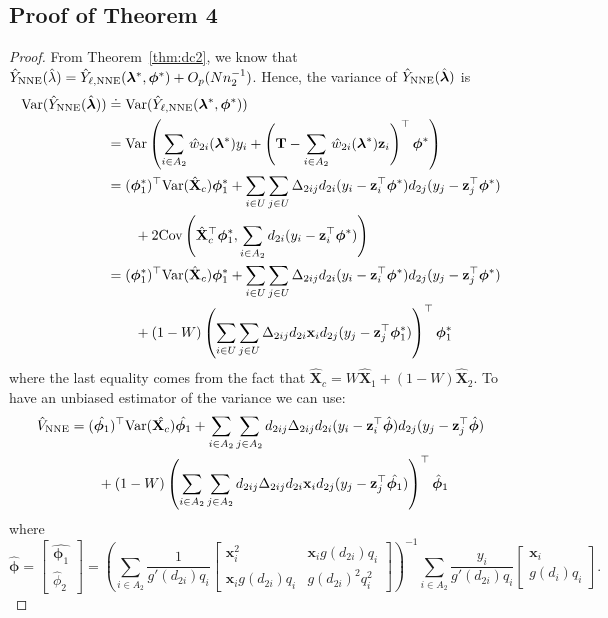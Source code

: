 \documentclass[12pt]{article}
\newcommand{\Cov}{{\text{Cov}}}
\newcommand{\Var}{{\text{Var}}}
\renewcommand{\bf}[1]{\mathbf{#1}}
\begin{document}
\subsection{Proof of Theorem 4}

\begin{proof}
  From Theorem~\ref{thm:dc2}, we know that $\hat Y_{\rm NNE}(\hat \lambda) = 
  \hat Y_{\ell, \rm NNE}(\bm \lambda^*, \bm \phi^*) + O_p(Nn_2^{-1})$. Hence, the
  variance of $\hat Y_{\rm NNE}(\hat{\bm \lambda})$ is 
  \begin{align*}
    \Var(\hat Y_{\rm NNE}(\hat{\bm \lambda})) 
    &\doteq \Var(\hat Y_{\ell, \rm NNE}(\bm \lambda^*, \bm \phi^*)) \\ 
    &= \Var\left(\sum_{i \in A_2} \hat w_{2i}(\bm \lambda^*) y_i + 
      \left(\bf T - \sum_{i \in A_2} \hat w_{2i}(\bm \lambda^*) \bf z_i
    \right)^\top \bm \phi^*\right)\\
    &= (\bm \phi_1^*)^\top \Var(\hat{\bf X}_c) \bm \phi_1^* + 
    \sum_{i \in U} \sum_{j \in U} \Delta_{2ij}d_{2i} 
    (y_i - \bf{z}_i^\top \bm \phi^*)d_{2j}(y_j - \bf{z}_j^\top \bm \phi^*)\\
    &\qquad+ 2 \Cov\left(\hat{\bf X}_c^\top \bm \phi_1^*, \sum_{i \in A_2} 
    d_{2i}(y_i - \bf{z}_i^\top \bm \phi^*)\right) \\
    &= (\bm \phi_1^*)^\top \Var(\hat{\bf X}_c) \bm \phi_1^* + 
    \sum_{i \in U} \sum_{j \in U} \Delta_{2ij}d_{2i}
    (y_i - \bf{z}_i^\top \bm \phi^*)d_{2j}(y_j - \bf{z}_j^\top \bm \phi^*)\\
    &\qquad + (1 - W)\left(\sum_{i \in U} \sum_{j \in U} \Delta_{2ij} 
    d_{2i}\bf{x}_i d_{2j}(y_j - \bf{z}_j^\top \bm \phi^*_1)\right)^\top \bm \phi_1^* \\
  \end{align*}
where the last equality comes from the fact that $\hat{\bf X}_c = W\hat{\bf
X}_1 + (1 - W) \hat{\bf X}_2$. To have an unbiased estimator of the variance
  we can use:
  \begin{align*}
    \hat V_{\rm NNE} 
    &= (\hat{\bm \phi_1})^\top \Var(\hat{\bf X_c}) \hat{\bm \phi_1} + 
    \sum_{i \in A_2} \sum_{j \in A_2} d_{2ij}\Delta_{2ij}d_{2i}
    (y_i - \bf{z}^\top_i \hat{\bm \phi})d_{2j}(y_j - \bf{z}^\top_j \hat{\bm \phi}) \\
    &\qquad + (1 - W)\left(\sum_{i \in A_2} \sum_{j \in A_2} 
      d_{2ij} \Delta_{2ij} d_{2i}\bf{x}_i
    d_{2j}(y_j - \bf{z}^\top_j \hat{\bm \phi_1})\right)^\top \hat{\bm \phi}_1 
  \end{align*}
  where 
  $$\hat{\bm \phi} =
  \begin{bmatrix}
    \hat{\bm \phi_1} \\ \hat \phi_2
  \end{bmatrix} = 
  \left(\sum_{i \in A_2} \frac{1}{g'(d_{2i})q_i} 
  \begin{bmatrix}
    \bf x_i^2 & \bf x_i g(d_{2i}) q_i \\
    \bf x_i g(d_{2i}) q_i & g(d_{2i})^2 q_i^2
  \end{bmatrix}
  \right)^{-1}
  \sum_{i \in A_2} \frac{y_i}{g'(d_{2i})q_i} 
  \begin{bmatrix} \bf x_i \\ g(d_i) q_i \end{bmatrix}.
  $$


\end{proof}
\end{document}
